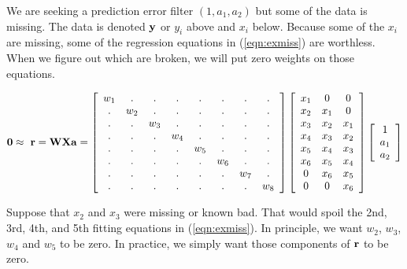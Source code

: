 \par
We are seeking a prediction error filter $(1,a_1,a_2)$
but some of the data is missing.
The data is denoted $\bold y$ or $y_i$ above and $x_i$ below.
Because some of the  $x_i$ are missing,
some of the regression equations in (\ref{eqn:exmiss}) are worthless.
When we figure out which are broken, we will put zero weights on those equations.


\begin{equation}
\bold 0
 \approx\ \bold r = \bold W \bold X \bold a =
\left[
        \begin{array}{cccccccc}
          w_1& . & . & . & . & . & . & .  \\
           . &w_2& . & . & . & . & . & .  \\
           . & . &w_3& . & . & . & . & .  \\
           . & . & . &w_4& . & . & . & .  \\
           . & . & . & . &w_5& . & . & .  \\
           . & . & . & . & . &w_6& . & .  \\
           . & . & . & . & . & . &w_7& .  \\
           . & . & . & . & . & . & . &w_8
          \end{array}
\right]
        \left[
        \begin{array}{ccc}
          x_1 & 0   & 0    \\
          x_2 & x_1 & 0    \\
          x_3 & x_2 & x_1  \\
          x_4 & x_3 & x_2  \\
          x_5 & x_4 & x_3  \\
          x_6 & x_5 & x_4  \\
          0   & x_6 & x_5  \\
          0   & 0   & x_6
          \end{array} \right]
        \left[
        \begin{array}{c}
          1   \\
          a_1 \\
          a_2 \end{array} \right]
\label{eqn:exmiss}
\end{equation}

\par
Suppose that $x_2$ and $x_3$ were missing or known bad.
That would spoil the 2nd, 3rd, 4th, and 5th fitting equations
in (\ref{eqn:exmiss}).
In principle, we want $w_2$, $w_3$, $w_4$ and $w_5$ to be zero.
In practice, we simply want those components of $\bold r$ to be zero.

